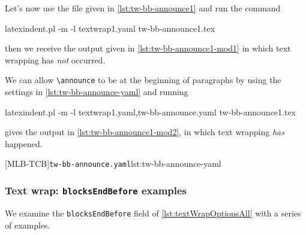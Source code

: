  \begin{example}
 Let's now use the file given in \cref{lst:tw-bb-announce1}
 and run the command

 \begin{commandshell}
latexindent.pl -m -l textwrap1.yaml tw-bb-announce1.tex
\end{commandshell}

 then we receive the output given in \cref{lst:tw-bb-announce1-mod1} in which text
 wrapping has \emph{not} occurred.


 We can allow \lstinline!\announce! to be at the beginning of paragraphs by using the
 settings in \cref{lst:tw-bb-announce-yaml} and running
 \begin{widepage}

  \begin{commandshell}
latexindent.pl -m -l textwrap1.yaml,tw-bb-announce.yaml tw-bb-announce1.tex
\end{commandshell}

 \end{widepage}
 gives the output in \cref{lst:tw-bb-announce1-mod2}, in which text wrapping \emph{has}
 happened.
 \begin{cmhtcbraster}[raster column skip=.1\linewidth,]
  [MLB-TCB]{\texttt{tw-bb-announce.yaml}}{lst:tw-bb-announce-yaml}
 \end{cmhtcbraster}

 \end{example}

\subsubsection{Text wrap: \texttt{blocksEndBefore} examples}
 We examine the \texttt{blocksEndBefore} field of \cref{lst:textWrapOptionsAll} with a
 series of examples. 

